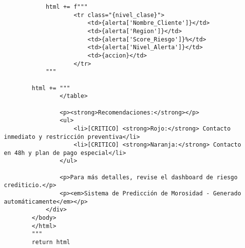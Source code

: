 \begin{verbatim}
            html += f"""
                    <tr class="{nivel_clase}">
                        <td>{alerta['Nombre_Cliente']}</td>
                        <td>{alerta['Region']}</td>
                        <td>{alerta['Score_Riesgo']}%</td>
                        <td>{alerta['Nivel_Alerta']}</td>
                        <td>{accion}</td>
                    </tr>
            """
        
        html += """
                </table>
                
                <p><strong>Recomendaciones:</strong></p>
                <ul>
                    <li>[CRITICO] <strong>Rojo:</strong> Contacto inmediato y restricción preventiva</li>
                    <li>[CRITICO] <strong>Naranja:</strong> Contacto en 48h y plan de pago especial</li>
                </ul>
                
                <p>Para más detalles, revise el dashboard de riesgo crediticio.</p>
                <p><em>Sistema de Predicción de Morosidad - Generado automáticamente</em></p>
            </div>
        </body>
        </html>
        """
        return html
\end{verbatim}
